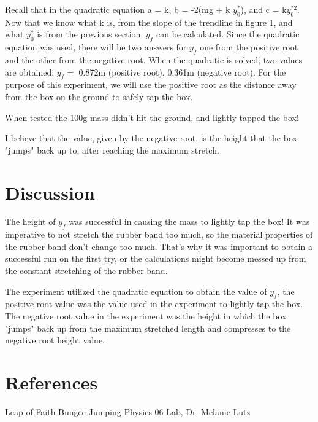 \documentclass[aps,letterpaper,11pt]{revtex4}
\begin{document}
Recall that in the quadratic equation a = k, b = -2(mg + k $y_0^*$), and c = k$y_0^{*2}$. Now that we know what k is, from the slope of the trendline in figure 1, and what $y_0^*$ is from the previous section, $y_f$ can be calculated. Since the quadratic equation was used, there will be two answers for $y_f$ one from the positive root and the other from the negative root. When the quadratic is solved, two values are obtained: $y_f =$ 0.872m (positive root), 0.361m (negative root). For the purpose of this experiment, we will use the positive root as the distance away from the box on the ground to safely tap the box. 

When tested the 100g mass didn't hit the ground, and lightly tapped the box! 

I believe that the value, given by the negative root, is the height that the box "jumps" back up to, after reaching the maximum stretch.  

\section{Discussion} 

The height of $y_f$ was successful in causing the mass to lightly tap the box! It was imperative to not stretch the rubber band too much, so the material properties of the rubber band don't change too much. That's why it was important to obtain a successful run on the first try, or the calculations might become messed up from the constant stretching of the rubber band. 

The experiment utilized the quadratic equation to obtain the value of $y_f$, the positive root value was the value used in the experiment to lightly tap the box. The negative root value in the experiment was the height in which the box "jumps" back up from the maximum stretched length and compresses to the negative root height value.

\section{References}

\hspace{-6.5mm}
Leap of Faith Bungee Jumping Physics 06 Lab, Dr. Melanie Lutz\\
\end{document}
